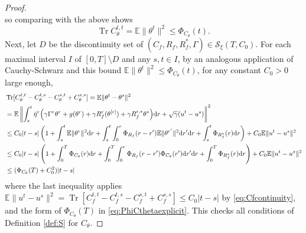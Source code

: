 \documentclass[11pt,letterpaper,reqno]{amsart}
\theoremstyle{definition}
\def\d{\mathrm{d}}
\def\E{\mathbb{E}}
\def\Tr{\operatorname{Tr}}
\def\cS{\mathcal{S}}
\def\Ct{C_\theta}
\def\Cf{C_f}
\def\Rf{R_f}
\newcommand{\norm}[1]{\|#1\|}
\begin{document}
\begin{proof}
\begin{equation}
\end{equation}
so comparing with the above shows
\[\Tr C_\theta^{t,t}=\E\|\theta^t\|^2 \leq \Phi_{\Ct}(t).\]
Next, let $D$ be the discontinuity set of $(\Cf,\Rf,\Rf^*,\Gamma) \in
\cS_\xi(T,C_0)$.
For each maximal interval $I$ of $[0,T] \setminus D$
and any $s,t\in I$, by an analogous application of Cauchy-Schwarz
and this bound $\E\|\theta^t\|^2 \leq \Phi_{C_\theta}(t)$, for any constant
$C_0>0$ large enough,
\begin{align}
&\Tr[\Ct^{t,t} - \Ct^{t,s} - \Ct^{s,t} + \Ct^{s,s}]
=\E \norm{\theta^t-\theta^s}^2\notag\\
&=\E\left\|\int_s^t \bar\eta^r \Big({\gamma}\Gamma^r
\theta^r+g(\theta^r)+{\gamma}R_f^{r}(\theta^{[r]})+
{\gamma}R_f^{r,*}\theta^*\Big)\d r+\sqrt{\gamma}(u^t-u^s)\right\|^2\notag\\
&\leq C_0|t-s|\left(1+\int_s^t \E\|\theta^r\|^2\d r
+\int_s^t\int_0^r \Phi_{R_f}(r-r')\E\|\theta^{r'}\|^2\d r'\d r
+\int_s^t\Phi_{R_f^*}(r)\d r\right)+C_0\E\|u^t-u^s\|^2\notag\\
&\leq C_0|t-s|\left(1+\int_0^T \Phi_{C_\theta}(r)\d r
+\int_0^T \int_0^r \Phi_{R_f}(r-r')\Phi_{C_\theta}(r')\d r' \d r
+\int_0^T \Phi_{R_f^*}(r)\d r\right)
+C_0\E\|u^t-u^s\|^2\notag\\
&\leq (\Phi_{C_\theta}(T)+C_0^2)|t-s|\label{eq:bound-cont-Ct}
\end{align}
where the last inequality applies
$\E\norm{u^t-u^s}^2=\Tr[\Cf^{t,t}-\Cf^{t,s}-\Cf^{s,t}+\Cf^{s,s}]
\leq C_0|t-s|$ by \eqref{eq:Cfcontinuity}, and the form of
$\Phi_{\Ct}(T)$ in \eqref{eq:PhiCthetaexplicit}.
This checks all conditions of Definition \ref{def:S} for $C_\theta$.


\end{proof}
\end{document}
